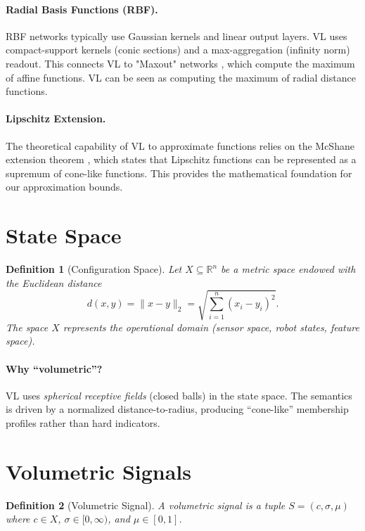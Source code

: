 \documentclass[11pt]{article}
\newtheorem{definition}{Definition}
\begin{document}
\paragraph{Radial Basis Functions (RBF).}
RBF networks \cite{broomhead1988multivariable} typically use Gaussian kernels and linear output layers. VL uses compact-support kernels (conic sections) and a max-aggregation (infinity norm) readout. This connects VL to "Maxout" networks \cite{goodfellow2013maxout}, which compute the maximum of affine functions. VL can be seen as computing the maximum of radial distance functions.

\paragraph{Lipschitz Extension.}
The theoretical capability of VL to approximate functions relies on the McShane extension theorem \cite{mcshane1934extension}, which states that Lipschitz functions can be represented as a supremum of cone-like functions. This provides the mathematical foundation for our approximation bounds.

\section{State Space}

\begin{definition}[Configuration Space]
Let $X \subseteq \mathbb{R}^n$ be a metric space endowed with the Euclidean distance
\begin{equation}
d(x,y)=\|x-y\|_2=\sqrt{\sum_{i=1}^{n}(x_i-y_i)^2}.
\end{equation}
The space $X$ represents the operational domain (sensor space, robot states, feature space).
\end{definition}

\paragraph{Why ``volumetric''?}
VL uses \emph{spherical receptive fields} (closed balls) in the state space. The semantics is driven by a normalized distance-to-radius, producing ``cone-like'' membership profiles rather than hard indicators.

\section{Volumetric Signals}

\begin{definition}[Volumetric Signal]
A volumetric signal is a tuple $S=(c,\sigma,\mu)$ where $c\in X$, $\sigma\in[0,\infty)$, and $\mu\in[0,1]$.
\end{definition}
\end{document}
